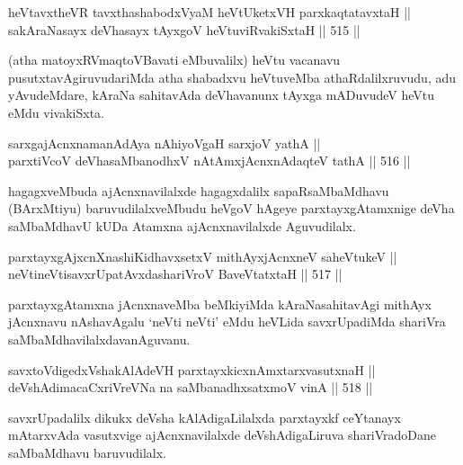 
\begin{shl}
heVtavxtheVR tavxthashabodxV\s yaM heVtUketxVH parxkaqtatavxtaH || \\
sakAraNasayx deVhasayx tAyxgoV heVtuviRvakiSxtaH \hfill || 515 ||  
\end{shl}

\begin{artha}
(atha matoyxRV\s maqtoVBavati eMbuvalilx) heVtu vacanavu
pusutxtavAgiruvudariMda atha shabadxvu heVtuveMba athaRdalilxruvudu,
adu yAvudeMdare, kAraNa sahitavAda deVhavanunx tAyxga mADuvudeV heVtu
eMdu vivakiSxta.
\end{artha}

\begin{shl}
sarxgajAcnxnamanAdAya nAhiyoVgaH sarxjoV yathA || \\
parxtiVcoV deVhasaMbanodhxV nA\s \s tAmxjAcnxnAdaqteV tathA \hfill || 516 ||  
\end{shl}

\begin{artha}
hagagxveMbuda ajAcnxnavilalxde hagagxdalilx sapaRsaMbaMdhavu
(BArxMtiyu) baruvudilalxveMbudu heVgoV hAgeye parxtayxgAtamxnige deVha
saMbaMdhavU kUDa Atamxna ajAcnxnavilalxde Aguvudilalx.
\end{artha}

\begin{shl}
parxtayxgAjxcnXnashiKidhavxsetxV mithAyxjAcnxneV saheVtukeV || \\
neVtineVtisavxrUpatAvxdashariVroV BaveVtatxtaH \hfill || 517 ||  
\end{shl}

\begin{artha}
parxtayxgAtamxna jAcnxnaveMba beMkiyiMda kAraNasahitavAgi mithAyx
jAcnxnavu nAshavAgalu `neVti neVti' eMdu heVLida savxrUpadiMda
shariVra saMbaMdhavilalxdavanAguvanu.
\end{artha}

\begin{shl}
savxtoV\s digedxVshakAlAdeVH parxtayxkicxnAmxtarxvasutxnaH || \\
deVshAdimacaCxriVreVNa na saMbanadhxsatxmoV vinA \hfill || 518 ||  
\end{shl}

\begin{artha}
savxrUpadalilx dikukx deVsha kAlAdigaLilalxda parxtayxkf ceYtanayx
mAtarxvAda vasutxvige ajAcnxnavilalxde deVshAdigaLiruva shariVradoDane
saMbaMdhavu baruvudilalx.
\end{artha}

